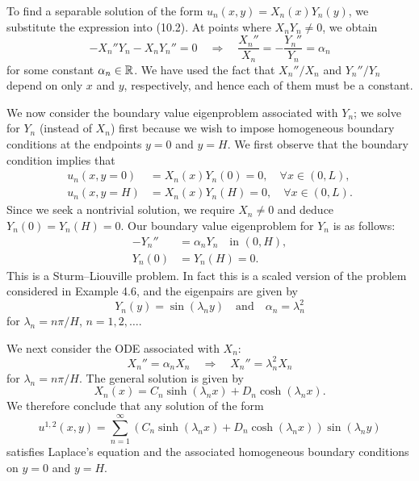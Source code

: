 To find a separable solution of the form $u_n(x, y) = X_n(x)Y_n(y)$, we substitute the expression into (10.2). At points where $X_nY_n \neq 0$, we obtain
\[-X_n''Y_n - X_nY_n'' = 0 \quad \Rightarrow \quad \frac{X_n''}{X_n} = -\frac{Y_n''}{Y_n} = \alpha_n\]
for some constant $\alpha_n \in \mathbb{R}$. We have used the fact that $X_n''/X_n$ and $Y_n''/Y_n$ depend on only $x$ and $y$, respectively, and hence each of them must be a constant.

We now consider the boundary value eigenproblem associated with $Y_n$; we solve for $Y_n$ (instead of $X_n$) first because we wish to impose homogeneous boundary conditions at the endpoints $y = 0$ and $y = H$. We first observe that the boundary condition implies that
\begin{align*}
    u_n(x, y = 0) &= X_n(x)Y_n(0) = 0, \quad \forall x \in (0, L), \\
    u_n(x, y = H) &= X_n(x)Y_n(H) = 0, \quad \forall x \in (0, L).
\end{align*}
Since we seek a nontrivial solution, we require $X_n \neq 0$ and deduce $Y_n(0) = Y_n(H) = 0$. Our boundary value eigenproblem for $Y_n$ is as follows:
\begin{align*}
    -Y_n'' &= \alpha_nY_n \quad \text{in } (0, H), \\
    Y_n(0) &= Y_n(H) = 0.
\end{align*}
This is a Sturm--Liouville problem. In fact this is a scaled version of the problem considered in Example 4.6, and the eigenpairs are given by
\[Y_n(y) = \sin(\lambda_ny) \quad \text{and} \quad \alpha_n = \lambda_n^2\]
for $\lambda_n = n\pi/H$, $n = 1, 2, \dots$.

We next consider the ODE associated with $X_n$:
\[X_n'' = \alpha_nX_n \quad \Rightarrow \quad X_n'' = \lambda_n^2X_n\]
for $\lambda_n = n\pi/H$. The general solution is given by
\[X_n(x) = C_n\sinh(\lambda_nx) + D_n\cosh(\lambda_nx).\]
We therefore conclude that any solution of the form
\[u^{1,2}(x, y) = \sum_{n=1}^{\infty} (C_n\sinh(\lambda_nx) + D_n\cosh(\lambda_nx))\sin(\lambda_ny)\]
satisfies Laplace's equation and the associated homogeneous boundary conditions on $y = 0$ and $y = H$.

